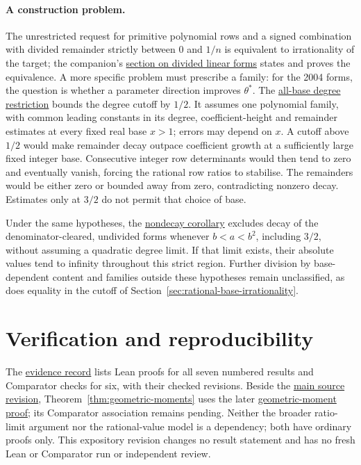 \documentclass[11pt]{article}
\newcommand{\shortrecordlink}[3]{\href{#1\##2}{#3}}
\newcommand{\latecommit}{035c414b25fda09ae0d2e56358b8716d321ebd99}
\newcommand{\laterepobase}{https://github.com/wcook04/plectis-erdos/blob/\latecommit}
\begin{document}
\paragraph{A construction problem.}\label{prob:kernel}
The unrestricted request for primitive polynomial rows and a signed
combination with divided remainder strictly between $0$ and $1/n$
is equivalent to irrationality of the target; the companion's
\shortrecordlink{erdos1049-rational-base-lambert-reasoning-surface.pdf}
{long1049-open-construction}{section on divided linear forms}
states and proves the equivalence. A more specific problem must
prescribe a family: for the 2004 forms, the question is whether a
parameter direction improves $\theta^*$. The
\shortrecordlink{erdos1049-rational-base-lambert-reasoning-surface.pdf}
{long1049-region-extensions}{all-base degree restriction}
bounds the degree cutoff by $1/2$. It assumes one polynomial family,
with common leading constants in its degree, coefficient-height and
remainder estimates at every fixed real base $x>1$; errors may depend
on $x$. A cutoff above $1/2$ would make remainder decay outpace
coefficient growth at a sufficiently large fixed integer base.
Consecutive integer row determinants would then tend to zero and
eventually vanish, forcing the rational row ratios to stabilise.
The remainders would be either zero or bounded away from zero,
contradicting nonzero decay. Estimates only at $3/2$ do not permit
that choice of base.

Under the same hypotheses, the
\shortrecordlink{erdos1049-rational-base-lambert-reasoning-surface.pdf}
{long1049-no-decay}{nondecay corollary}
excludes decay of the denominator-cleared, undivided forms whenever
$b<a<b^2$, including $3/2$, without assuming a quadratic degree
limit. If that limit exists, their absolute values tend to infinity
throughout this strict region. Further division by base-dependent
content and families outside these hypotheses remain unclassified,
as does equality in the cutoff of
Section~\ref{sec:rational-base-irrationality}.

\appendix
\section{Verification and reproducibility}\label{app:index}

The \href{\evidencerecordurl}{evidence record} lists Lean proofs for
all seven numbered results and Comparator checks for six, with
their checked revisions. Beside the \href{\sourceurl}{main source revision},
Theorem~\ref{thm:geometric-moments} uses the later
\href{\laterepobase/lean/ErdosProblems/Erdos1049/PaperCompleteR21/GeometricUniversality.lean\#L1324}{geometric-moment proof};
its Comparator association remains pending. Neither the broader
ratio-limit argument nor the rational-value model is a dependency;
both have ordinary proofs only. This expository revision changes no
result statement and has no fresh Lean or Comparator run or
independent review.
\evidenceparagraph{\evidencerecordurl}
\end{document}
